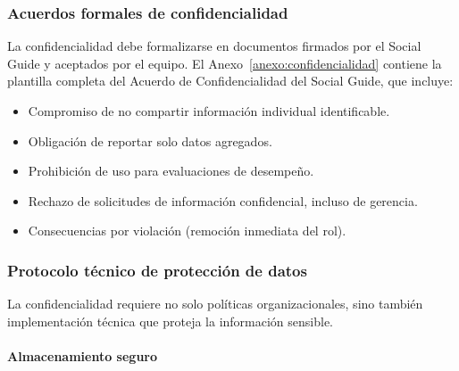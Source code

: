 \subsubsection{Acuerdos formales de confidencialidad}

La confidencialidad debe formalizarse en documentos firmados por el Social Guide y aceptados por el equipo. El Anexo~\ref{anexo:confidencialidad} contiene la plantilla completa del Acuerdo de Confidencialidad del Social Guide, que incluye:

\begin{itemize}
    \item Compromiso de no compartir información individual identificable.
    \item Obligación de reportar solo datos agregados.
    \item Prohibición de uso para evaluaciones de desempeño.
    \item Rechazo de solicitudes de información confidencial, incluso de gerencia.
    \item Consecuencias por violación (remoción inmediata del rol).
\end{itemize}

\subsubsection{Protocolo técnico de protección de datos}

La confidencialidad requiere no solo políticas organizacionales, sino también implementación técnica que proteja la información sensible.

\paragraph{Almacenamiento seguro}

